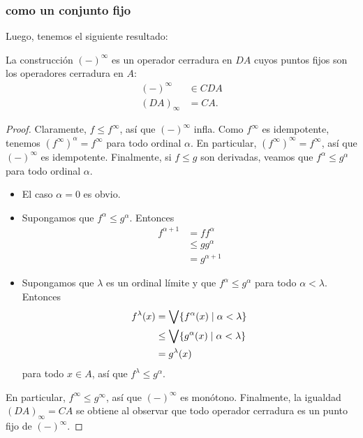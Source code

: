 \subsubsection{ como un conjunto fijo}
Luego, tenemos el siguiente resultado:
\begin{theorem}
    La construcción $({-})^\infty$ es un operador cerradura en $DA$
    cuyos puntos fijos son los operadores cerradura en $A$:
    \begin{align*}
      ({-})^\infty &\in CDA \\
      (DA)_\infty &= CA.
    \end{align*}
\end{theorem}
\begin{proof}
  Claramente, $f\leq f^\infty$, así que $(-)^\infty$ infla.
  Como $f^\infty$ es idempotente, tenemos $(f^\infty)^\alpha=f^\infty$
  para todo ordinal $\alpha$.
  En particular, $(f^\infty)^\infty=f^\infty$, así que
  $(-)^\infty$ es idempotente.
  Finalmente, si $f\leq g$ son derivadas, veamos que
  $f^\alpha\leq g^\alpha$ para todo ordinal $\alpha$.
  \begin{itemize}
    \item El caso $\alpha=0$ es obvio.
    \item Supongamos que $f^\alpha\leq g^\alpha$.
    Entonces
    \begin{align*}
        f^{\alpha+1}
        &= ff^\alpha \\
        &\leq gg^\alpha \\
        &= g^{\alpha+1}
    \end{align*}
    \item Supongamos que $\lambda$ es un ordinal límite y que
    $f^\alpha\leq g^\alpha$ para todo $\alpha<\lambda$.
    Entonces
    \begin{align*}
        f^\lambda(x)
        &= \bigvee\{f^\alpha(x)\mid \alpha<\lambda\} \\
        &\leq \bigvee\{g^\alpha(x) \mid \alpha<\lambda\} \\
        &= g^\lambda(x)
    \end{align*}
    para todo $x\in A$, así que $f^\lambda\leq g^\alpha$.
  \end{itemize}
  En particular, $f^\infty\leq g^\infty$, así que $(-)^\infty$ es
  monótono.
  Finalmente, la igualdad $(DA)_\infty=CA$ se obtiene al observar
  que todo operador cerradura es un punto fijo de $(-)^\infty$.
\end{proof}


